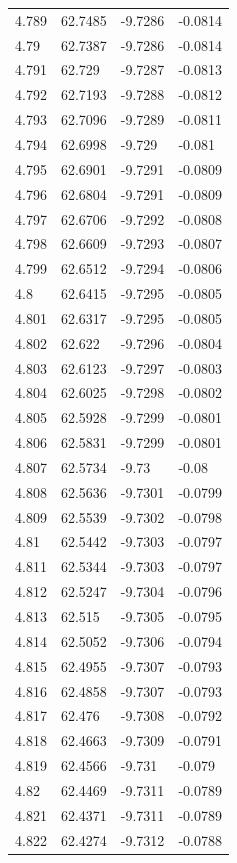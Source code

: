 \begin{tabular}{llll}
4.789 & 62.7485 & -9.7286 & -0.0814 \\
4.79 & 62.7387 & -9.7286 & -0.0814 \\
4.791 & 62.729 & -9.7287 & -0.0813 \\
4.792 & 62.7193 & -9.7288 & -0.0812 \\
4.793 & 62.7096 & -9.7289 & -0.0811 \\
4.794 & 62.6998 & -9.729 & -0.081 \\
4.795 & 62.6901 & -9.7291 & -0.0809 \\
4.796 & 62.6804 & -9.7291 & -0.0809 \\
4.797 & 62.6706 & -9.7292 & -0.0808 \\
4.798 & 62.6609 & -9.7293 & -0.0807 \\
4.799 & 62.6512 & -9.7294 & -0.0806 \\
4.8 & 62.6415 & -9.7295 & -0.0805 \\
4.801 & 62.6317 & -9.7295 & -0.0805 \\
4.802 & 62.622 & -9.7296 & -0.0804 \\
4.803 & 62.6123 & -9.7297 & -0.0803 \\
4.804 & 62.6025 & -9.7298 & -0.0802 \\
4.805 & 62.5928 & -9.7299 & -0.0801 \\
4.806 & 62.5831 & -9.7299 & -0.0801 \\
4.807 & 62.5734 & -9.73 & -0.08 \\
4.808 & 62.5636 & -9.7301 & -0.0799 \\
4.809 & 62.5539 & -9.7302 & -0.0798 \\
4.81 & 62.5442 & -9.7303 & -0.0797 \\
4.811 & 62.5344 & -9.7303 & -0.0797 \\
4.812 & 62.5247 & -9.7304 & -0.0796 \\
4.813 & 62.515 & -9.7305 & -0.0795 \\
4.814 & 62.5052 & -9.7306 & -0.0794 \\
4.815 & 62.4955 & -9.7307 & -0.0793 \\
4.816 & 62.4858 & -9.7307 & -0.0793 \\
4.817 & 62.476 & -9.7308 & -0.0792 \\
4.818 & 62.4663 & -9.7309 & -0.0791 \\
4.819 & 62.4566 & -9.731 & -0.079 \\
4.82 & 62.4469 & -9.7311 & -0.0789 \\
4.821 & 62.4371 & -9.7311 & -0.0789 \\
4.822 & 62.4274 & -9.7312 & -0.0788 \\

\end{tabular}
